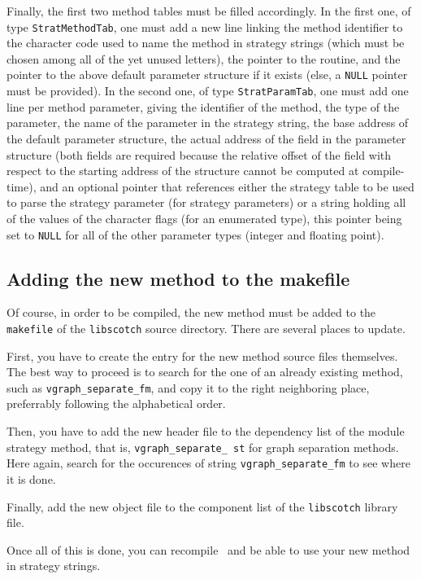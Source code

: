 Finally, the first two method tables must be filled accordingly. In the
first one, of type \texttt{Strat\lbt Method\lbt Tab}, one must add a new
line linking the method identifier to the character code used to name
the method in strategy strings (which must be chosen among all of
the yet unused letters), the pointer to the routine, and the pointer
to the above default parameter structure if it exists (else, a
\texttt{NULL} pointer must be provided).
In the second one, of type \texttt{Strat\lbt Param\lbt Tab}, one must add
one line per method parameter, giving the identifier of the method,
the type of the parameter, the name of the parameter in the strategy
string, the base address of the default parameter structure, the
actual address of the field in the parameter structure (both fields
are required because the relative offset of the field with respect to
the starting address of the structure cannot be computed at
compile-time), and an optional pointer that references either the
strategy table to be used to parse the strategy parameter (for
strategy parameters) or a string holding all of the values of the
character flags (for an enumerated type), this pointer being set to
\texttt{NULL} for all of the other parameter types (integer and floating
point).

\subsection{Adding the new method to the makefile}

Of course, in order to be compiled, the new method must be added to
the \texttt{makefile} of the \texttt{libscotch} source directory. There are
several places to update.

First, you have to create the entry for the new method source files
themselves. The best way to proceed is to search for the one of an
already existing method, such as \texttt{vgraph\_\lbt separate\_\lbt fm},
and copy it to the right neighboring place, preferrably following the
alphabetical order.

Then, you have to add the new header file to the dependency list of
the module strategy method, that is, \texttt{vgraph\_\lbt separate\_\lbt
st} for graph separation methods. Here again, search for the
occurences of string \texttt{vgraph\_\lbt separate\_\lbt fm} to see where
it is done.

Finally, add the new object file to the component list of the
\texttt{libscotch} library file.

Once all of this is done, you can recompile \scotch\ and be able to
use your new method in strategy strings.
